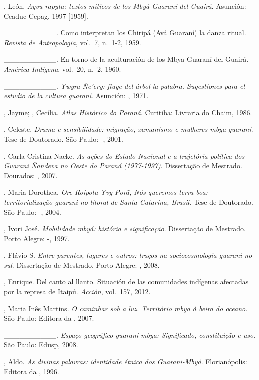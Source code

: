 {{\begin{Parskip}
, León. \emph{Ayvu rapyta: textos míticos de los Mbyá-Guaraní del
Guairá}. Asunción: Ceaduc-Cepag, 1997 [1959].

\_\_\_\_\_\_\_\_\_\_. Como interpretan los Chiripá (Avá Guaraní) la
danza ritual. \emph{Revista de Antropologia}, vol.~7, n.~1-2, 1959.

\_\_\_\_\_\_\_\_\_\_. En torno de la aculturación de los Mbya-Guaraní
del Guairá. \emph{América Indígena}, vol.~20, n.~2, 1960. 

\_\_\_\_\_\_\_\_\_\_. \emph{Ywyra Ñe’ery: fluye del árbol la palabra.
Sugestiones para el estudio de la cultura guaraní}. Asunción: ,
1971.

, Jayme; , Cecília. \emph{Atlas Histórico do Paraná}.
Curitiba: Livraria do Chaim, 1986.

, Celeste. \emph{Drama e sensibilidade: migração, xamanismo e
mulheres mbya guarani}. Tese de Doutorado. São Paulo: -, 2001.

, Carla Cristina Nacke. \emph{As ações do Estado Nacional e a
trajetória política dos Guarani Ñandeva no Oeste do Paraná (1977-1997)}.
Dissertação de Mestrado. Dourados: , 2007.

, Maria Dorothea. \emph{Ore Roipota Yvy Porã, Nós queremos terra boa:
territorialização guarani no litoral de Santa Catarina, Brasil}. Tese de
Doutorado. São Paulo: -, 2004.

, Ivori José.  \emph{Mobilidade mbyá: história e significação}.
Dissertação de Mestrado. Porto Alegre: -, 1997.

, Flávio S. \emph{Entre parentes, lugares e outros: traços na
sociocosmologia guarani no sul}. Dissertação de Mestrado. Porto Alegre:
, 2008.

, Enrique. Del canto al llanto. Situación de las comunidades
indígenas afectadas por la represa de Itaipú. \emph{Acción}, vol.~157, 2012.

, Maria Inês Martins. \emph{O caminhar sob a luz. Território mbya à
beira do oceano}. São Paulo: Editora da , 2007.

\_\_\_\_\_\_\_\_\_\_. \emph{Espaço geográfico guarani-mbya: Significado,
constituição e uso}. São Paulo: Edusp, 2008.

, Aldo. \emph{As divinas palavras: identidade étnica dos Guarani-Mbyá}.
Florianópolis: Editora da , 1996.


\end{Parskip}}}
